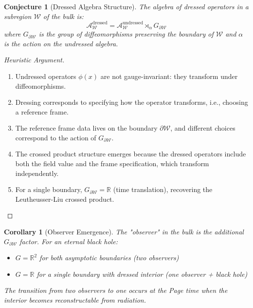 \documentclass[12pt,a4paper]{article}
\newtheorem{conjecture}[theorem]{Conjecture}
\newtheorem{corollary}[theorem]{Corollary}
\begin{document}
\begin{conjecture}[Dressed Algebra Structure]
The algebra of dressed operators in a subregion $\mathcal{W}$ of the bulk is:
\begin{equation}
\mathcal{A}_{\mathcal{W}}^{\text{dressed}} = \mathcal{A}_{\mathcal{W}}^{\text{undressed}} \rtimes_{\alpha} G_{\partial \mathcal{W}}
\end{equation}
where $G_{\partial \mathcal{W}}$ is the group of diffeomorphisms preserving the boundary of $\mathcal{W}$ and $\alpha$ is the action on the undressed algebra.
\end{conjecture}

\begin{proof}[Heuristic Argument]
\begin{enumerate}
    \item Undressed operators $\phi(x)$ are not gauge-invariant: they transform under diffeomorphisms.
    
    \item Dressing corresponds to specifying how the operator transforms, i.e., choosing a reference frame.
    
    \item The reference frame data lives on the boundary $\partial \mathcal{W}$, and different choices correspond to the action of $G_{\partial \mathcal{W}}$.
    
    \item The crossed product structure emerges because the dressed operators include both the field value and the frame specification, which transform independently.
    
    \item For a single boundary, $G_{\partial \mathcal{W}} = \mathbb{R}$ (time translation), recovering the Leutheusser-Liu crossed product.
\end{enumerate}
\end{proof}

\begin{corollary}[Observer Emergence]
The "observer" in the bulk is the additional $G_{\partial \mathcal{W}}$ factor. For an eternal black hole:
\begin{itemize}
    \item $G = \mathbb{R}^2$ for both asymptotic boundaries (two observers)
    \item $G = \mathbb{R}$ for a single boundary with dressed interior (one observer + black hole)
\end{itemize}
The transition from two observers to one occurs at the Page time when the interior becomes reconstructable from radiation.
\end{corollary}
\end{document}
